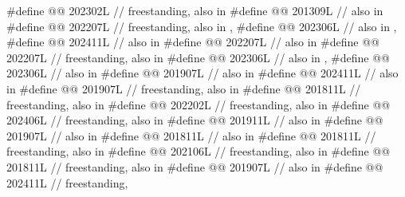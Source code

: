 \begin{codeblock}
#define @@          202302L // freestanding, also in 
#define @@                      201309L // also in 
#define @@                          202207L
  // freestanding, also in , 
#define @@              202306L // also in , 
#define @@                  202411L // also in 
#define @@                  202207L // also in 
#define @@                202207L // freestanding, also in 
#define @@                   202306L // also in , 
#define @@                 202306L // also in 
#define @@           201907L // also in 
#define @@              202411L // also in 
#define @@              201907L // freestanding, also in 
#define @@                201811L // freestanding, also in 
#define @@                  202202L // freestanding, also in 
#define @@                     202406L // freestanding, also in 
#define @@                 201911L // also in 
#define @@                  201907L // also in 
#define @@             201811L // also in 
#define @@                   201811L // freestanding, also in 
#define @@                202106L // freestanding, also in 
#define @@                 201811L // freestanding, also in 
#define @@                  201907L // also in 
#define @@              202411L // freestanding,

\end{codeblock}
